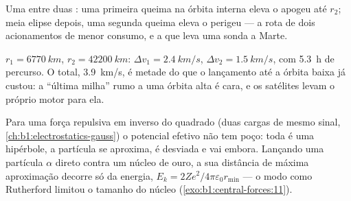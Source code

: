 \begin{omfigure}

{\small Uma  entre duas : uma primeira queima na
órbita interna eleva o apogeu até $r_2$; meia elipse depois, uma
segunda queima eleva o perigeu --- a rota de dois acionamentos de menor consumo, e
a que leva uma sonda a Marte.}
\end{omfigure}

\begin{example}\label{ex:b1:central-forces:leogeo}
$r_1 = \qty{6770}{km}$, $r_2 = \qty{42200}{km}$: $\Delta v_1 = \qty{2.4}{km/s}$,
$\Delta v_2 = \qty{1.5}{km/s}$, com \qty{5.3}{h} de percurso. O total,
\qty{3.9}{km/s}, é metade do que o lançamento até a órbita baixa já custou: a
``última milha'' rumo a uma órbita alta é cara, e os satélites levam o próprio
motor para ela.
\end{example}

\begin{remark}\label{rem:b1:central-forces:rutherford}
Para uma força repulsiva em inverso do quadrado (duas cargas de mesmo sinal,
\cref{ch:b1:electrostatics-gauss}) o potencial efetivo não tem poço:
toda  é uma hipérbole, a partícula se aproxima, é desviada
e vai embora. Lançando uma partícula $\alpha$ direto contra um núcleo de ouro, a sua
distância de máxima aproximação decorre só da energia, $E_k =
2Ze^2/4\pi\varepsilon_0 r_{\min}$ --- o modo como Rutherford limitou o tamanho do
núcleo (\cref{exo:b1:central-forces:11}).
\end{remark}

